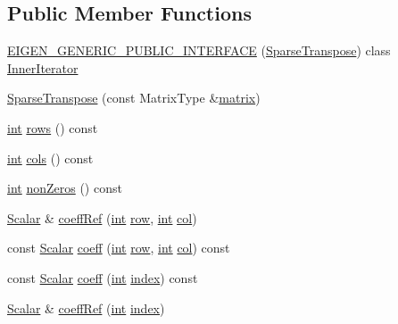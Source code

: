\subsection*{Public Member Functions}
\begin{DoxyCompactItemize}
\item 
\hyperlink{class_sparse_transpose_ae31c6029171442c4086486435520eb48}{E\-I\-G\-E\-N\-\_\-\-G\-E\-N\-E\-R\-I\-C\-\_\-\-P\-U\-B\-L\-I\-C\-\_\-\-I\-N\-T\-E\-R\-F\-A\-C\-E} (\hyperlink{class_sparse_transpose}{Sparse\-Transpose}) class \hyperlink{class_sparse_transpose_1_1_inner_iterator}{Inner\-Iterator}
\item 
\hyperlink{class_sparse_transpose_aa8b2d3ab0cbc98d42df2339e8416369a}{Sparse\-Transpose} (const Matrix\-Type \&\hyperlink{glext_8h_a7b24a3f2f56eb1244ae69dacb4fecb6f}{matrix})
\item 
\hyperlink{ioapi_8h_a787fa3cf048117ba7123753c1e74fcd6}{int} \hyperlink{class_sparse_transpose_a62710bc10663f5edc3f0da0b8a7599f3}{rows} () const 
\item 
\hyperlink{ioapi_8h_a787fa3cf048117ba7123753c1e74fcd6}{int} \hyperlink{class_sparse_transpose_a68609cb2bf6ce7e549e5926223aa04af}{cols} () const 
\item 
\hyperlink{ioapi_8h_a787fa3cf048117ba7123753c1e74fcd6}{int} \hyperlink{class_sparse_transpose_a0f18e6e8a96188fb0c01351809a13cb0}{non\-Zeros} () const 
\item 
\hyperlink{class_sparse_matrix_base_af39d70f2b7e775e9e17b666cd24128c8}{Scalar} \& \hyperlink{class_sparse_transpose_ae57c0ba5aadff44de75d19c1e22b538b}{coeff\-Ref} (\hyperlink{ioapi_8h_a787fa3cf048117ba7123753c1e74fcd6}{int} \hyperlink{glext_8h_a11b277b422822f784ee248b43eee3e1e}{row}, \hyperlink{ioapi_8h_a787fa3cf048117ba7123753c1e74fcd6}{int} \hyperlink{class_sparse_matrix_base_a711a8f11f5f1915057922412dac2cc25}{col})
\item 
const \hyperlink{class_sparse_matrix_base_af39d70f2b7e775e9e17b666cd24128c8}{Scalar} \hyperlink{class_sparse_transpose_ad649c4554b246a2fd6bad1c09dd69707}{coeff} (\hyperlink{ioapi_8h_a787fa3cf048117ba7123753c1e74fcd6}{int} \hyperlink{glext_8h_a11b277b422822f784ee248b43eee3e1e}{row}, \hyperlink{ioapi_8h_a787fa3cf048117ba7123753c1e74fcd6}{int} \hyperlink{class_sparse_matrix_base_a711a8f11f5f1915057922412dac2cc25}{col}) const 
\item 
const \hyperlink{class_sparse_matrix_base_af39d70f2b7e775e9e17b666cd24128c8}{Scalar} \hyperlink{class_sparse_transpose_aa618f59bd015da48953a1d28d03bead1}{coeff} (\hyperlink{ioapi_8h_a787fa3cf048117ba7123753c1e74fcd6}{int} \hyperlink{glext_8h_ab47dd9958bcadea08866b42bf358e95e}{index}) const 
\item 
\hyperlink{class_sparse_matrix_base_af39d70f2b7e775e9e17b666cd24128c8}{Scalar} \& \hyperlink{class_sparse_transpose_a58dfe43dfa719fe7c0966449cbb68a7b}{coeff\-Ref} (\hyperlink{ioapi_8h_a787fa3cf048117ba7123753c1e74fcd6}{int} \hyperlink{glext_8h_ab47dd9958bcadea08866b42bf358e95e}{index})
\end{DoxyCompactItemize}
